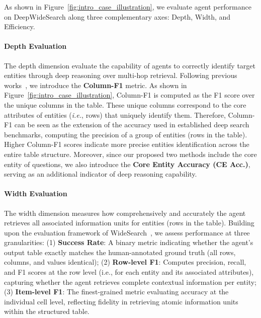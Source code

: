 \documentclass[11pt, letterpaper, logo, onecolumn, copyright, numbering]{paper_improved}
\let\cite\citep
\begin{document}
As shown in Figure~\ref{fig:intro_case_illustration}, we evaluate agent performance on DeepWideSearch along three complementary axes: Depth, Width, and Efficiency.

\paragraph{Depth Evaluation}

The depth dimension evaluate the capability of agents to correctly identify target entities through deep reasoning over multi-hop retrieval. Following previous works~\cite{wei2025browsecompsimplechallengingbenchmark,mialon2023gaiabenchmarkgeneralai}, we introduce the \textbf{Column-F1} metric. As shown in Figure~\ref{fig:intro_case_illustration}, Column-F1 is computed as the F1 score over the unique columns in the table. These unique columns correspond to the core attributes of entities (\textit{i.e.}, rows) that uniquely identify them. Therefore, Column-F1 can be seen as the extension of the accuracy used in established deep search benchmarks, computing the precision of a group of entities (rows in the table).
Higher Column-F1 scores indicate more precise entities identification across the entire table structure.
Moreover, since our proposed two methods include the core entity of questions, we also introduce the \textbf{Core Entity Accuracy (CE Acc.)}, serving as an additional indicator of deep reasoning capability.

\paragraph{Width Evaluation}

The width dimension measures how comprehensively and accurately the agent retrieves all associated information units for entities (rows in the table). Building upon the evaluation framework of WideSearch~\cite{wong2025widesearch}, we assess performance at three granularities: (1) \textbf{Success Rate}: A binary metric indicating whether the agent's output table exactly matches the human-annotated ground truth (all rows, columns, and values identical); (2) \textbf{Row-level F1}: Computes precision, recall, and F1 scores at the row level (i.e., for each entity and its associated attributes), capturing whether the agent retrieves complete contextual information per entity; (3) \textbf{Item-level F1}: The finest-grained metric evaluating accuracy at the individual cell level, reflecting fidelity in retrieving atomic information units within the structured table.
\end{document}
